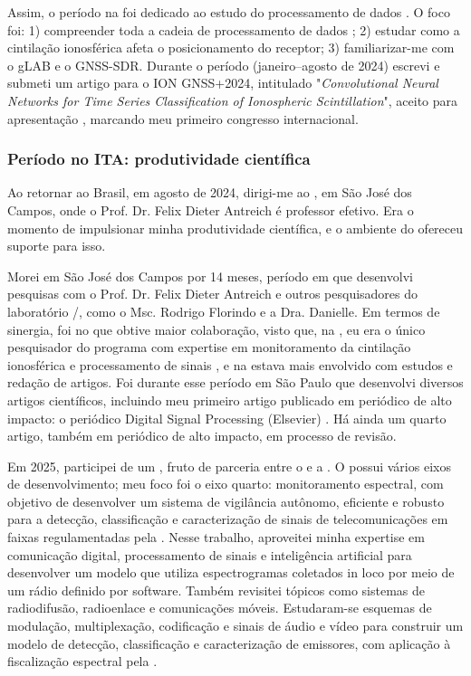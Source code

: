 \documentclass{article}
\begin{document}
Assim, o período na  foi dedicado ao estudo do processamento de dados . O foco foi: 1) compreender toda a cadeia de processamento de dados ; 2) estudar como a cintilação ionosférica afeta o posicionamento do receptor; 3) familiarizar-me com o gLAB e o GNSS-SDR. Durante o período (janeiro–agosto de 2024) escrevi e submeti um artigo para o ION GNSS+2024, intitulado "\emph{Convolutional Neural Networks for Time Series Classification of Ionospheric Scintillation}", aceito para apresentação \cite{pacelliConvolutionalNeuralNetworks2024}, marcando meu primeiro congresso internacional.

\subsubsection{Período no ITA: produtividade científica}

Ao retornar ao Brasil, em agosto de 2024, dirigi-me ao , em São José dos Campos, onde o Prof. Dr. Felix Dieter Antreich é professor efetivo. Era o momento de impulsionar minha produtividade científica, e o ambiente do  ofereceu suporte para isso.

Morei em São José dos Campos por 14 meses, período em que desenvolvi pesquisas com o Prof. Dr. Felix Dieter Antreich e outros pesquisadores do laboratório /, como o Msc. Rodrigo Florindo e a Dra. Danielle. Em termos de sinergia, foi no  que obtive maior colaboração, visto que, na , eu era o único pesquisador do programa com expertise em monitoramento da cintilação ionosférica e processamento de sinais , e na  estava mais envolvido com estudos e redação de artigos. Foi durante esse período em São Paulo que desenvolvi diversos artigos científicos, incluindo meu primeiro artigo publicado em periódico de alto impacto: o periódico Digital Signal Processing (Elsevier) \cite{pacelliAlldigitalCoherentAFSK2025,pacelliCharacterizationIonosphericScintillation2025,florindoAdvancedKalmanFilter2025}. Há ainda um quarto artigo, também em periódico de alto impacto, em processo de revisão.

Em 2025, participei de um , fruto de parceria entre o  e a . O  possui vários eixos de desenvolvimento; meu foco foi o eixo quarto: monitoramento espectral, com objetivo de desenvolver um sistema de vigilância autônomo, eficiente e robusto para a detecção, classificação e caracterização de sinais de telecomunicações em faixas regulamentadas pela . Nesse trabalho, aproveitei minha expertise em comunicação digital, processamento de sinais e inteligência artificial para desenvolver um modelo que utiliza espectrogramas coletados in loco por meio de um rádio definido por software. Também revisitei tópicos como sistemas de radiodifusão, radioenlace  e comunicações móveis. Estudaram-se esquemas de modulação, multiplexação, codificação e sinais de áudio e vídeo para construir um modelo de detecção, classificação e caracterização de emissores, com aplicação à fiscalização espectral pela .
\end{document}
